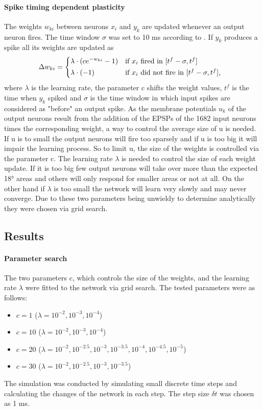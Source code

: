 \paragraph{Spike timing dependent plasticity}
The weights $w_{ki}$ between neurons $x_i$ and $y_k$ are updated whenever an output neuron fires. The time window $\sigma$ was set to 10 ms according to \citet{nessler}. If $y_k$ produces a spike all its weights are updated as
\begin{equation}
\label{deltawki}
\Delta w_{ki} = \begin{dcases*} \lambda \cdot (ce^{-w_{ki}} - 1) & if $x_{i}$ fired in $ [t^f - \sigma, t^f] $ \\
\lambda \cdot (-1) & \text{if $ x_i $ did not fire in $ [t^f - \sigma, t^f] $, } \end{dcases*}
\end{equation}
where $\lambda$ is the learning rate, the parameter c shifts the weight values, $t^f$ is the time when $y_k$ spiked and $\sigma$ is the time window in which input spikes are considered as "before" an output spike. As the membrane potentials $u_k$ of the output neurons result from the addition of the EPSPs of the 1682 input neurons times the corresponding weight, a way to control the average size of u is needed. If u is to small the output neurons will fire too sparsely and if u is too big it will impair the learning process. So to limit u, the size of the weights is controlled via the parameter c. The learning rate $\lambda$ is needed to control the size of each weight update. If it is too big few output neurons will take over more than the expected 18° areas and others will only respond for smaller areas or not at all. On the other hand if $\lambda$ is too small the network will learn very slowly and may never converge. Due to these two parameters being unwieldy to determine analytically they were chosen via grid search. 


\subsection{Results}

\paragraph{Parameter search}
The two parameters c, which controls the size of the weights, and the learning rate $\lambda$ were fitted to the network via grid search.	The tested parameters were as follows:
\begin{itemize}
  \item $c = 1$ ($\lambda = 10^{-2}, 10^{-3}, 10^{-4}$) 
  \item $c = 10$ ($\lambda = 10^{-2}, 10^{-3}, 10^{-4}$) 
  \item $c = 20$ ($\lambda = 10^{-2}, 10^{-2.5}, 10^{-3}, 10^{-3.5},  10^{-4}, 10^{-4.5}, 10^{-5}$) 
  \item $c = 30$ ($\lambda = 10^{-2}, 10^{-2.5}, 10^{-3}, 10^{-3.5}$) 
\end{itemize}
The simulation was conducted by simulating small discrete time steps and calculating the changes of the network in each step. The step size $\delta t$ was chosen as 1 ms.

